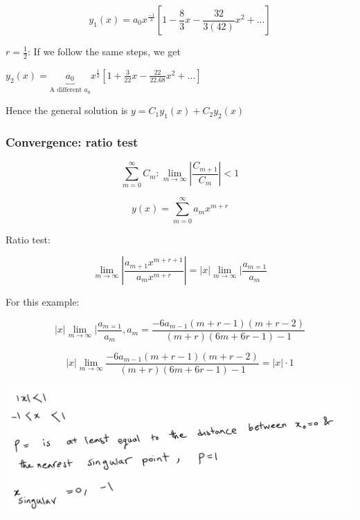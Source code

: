 \documentclass{article}
\begin{document}
$$y_1(x) = a_0 x^{\frac{-1}{3}} \left[ 1- \frac{8}{3} x - \frac{32}{3(42)} x^2 + ... \right]$$

$r = \frac{1}{2}$: If we follow the same steps, we get 

$y_2(x) = \underbrace{a_0}_{\text{A different } a_0} x^{\frac{1}{2}} \left[ 1 + \frac{3}{22} x - \frac{22}{22.68}x^2 + ... \right]$

Hence the general solution is $y = C_1 y_1 (x) + C_2 y_2 (x)$

\subsubsection{Convergence: ratio test}

$$\sum_{m = 0}^\infty C_m: \lim_{m \to \infty} | \frac{C_{m+1}}{C_m} | < 1$$

$$y(x) = \sum_{m = 0}^\infty a_m x^{m+r}$$

Ratio test:

$$\lim_{m \to \infty} | \frac{a_{m+1} x^{m+r+1}}{a_m x^{m+r}} | = |x| \lim_{m \to \infty} | \frac{a_{m=1}}{a_m}$$

For this example:

$$ |x| \lim_{m \to \infty} | \frac{a_{m=1}}{a_m}, a_m = \frac{-6 a_{m-1} (m+r-1) (m+r-2)}{(m+r) (6m + 6r - 1) - 1}$$

$$ |x| \lim_{m \to \infty}  \frac{-6 a_{m-1} (m+r-1) (m+r-2)}{(m+r) (6m + 6r - 1) - 1} = |x| \cdot 1$$

\includegraphics[width = 0.95 \textwidth]{image7.png}
\end{document}
